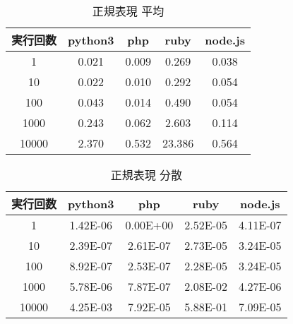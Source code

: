 \begin{table}[tb]
\centering
\begin{tabular}{|c||c|c|c|c|}
\hline
実行回数	&python3	&php	&ruby	&node.js\\ \hline
1	&0.021	&0.009	&0.269	&0.038\\ \hline
10	&0.022	&0.010	&0.292	&0.054\\ \hline
100	&0.043	&0.014	&0.490	&0.054\\ \hline
1000	&0.243	&0.062	&2.603	&0.114\\ \hline
10000	&2.370	&0.532	&23.386	&0.564\\ \hline

\end{tabular}
\caption{正規表現 平均}
\label{table:s-average}
\end{table}

\begin{table}[tb]
\centering
\begin{tabular}{|c||c|c|c|c|}
\hline
実行回数	&python3	&php	&ruby	&node.js\\ \hline
1	&1.42E-06	&0.00E+00	&2.52E-05	&4.11E-07\\ \hline
10	&2.39E-07	&2.61E-07	&2.73E-05	&3.24E-05\\ \hline
100	&8.92E-07	&2.53E-07	&2.28E-05	&3.24E-05\\ \hline
1000	&5.78E-06	&7.87E-07	&2.08E-02	&4.27E-06\\ \hline
10000	&4.25E-03	&7.92E-05	&5.88E-01	&7.09E-05\\ \hline
\end{tabular}
\caption{正規表現 分散}
\label{table:s-dispersion}
\end{table}